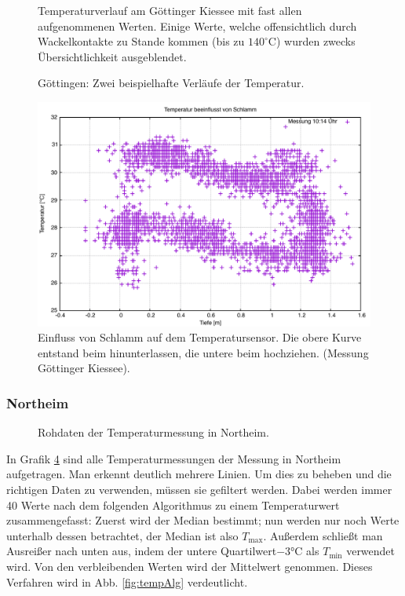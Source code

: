 \documentclass[12pt,a4paper,titlepage,headinclude,bibtotoc]{scrartcl}
\numberwithin{equation}{subsection}
\begin{document}
\begin{figure}[h]
\centering

\caption{Temperaturverlauf am Göttinger Kiessee mit fast allen aufgenommenen Werten. Einige Werte, welche offensichtlich durch Wackelkontakte zu Stande kommen (bis zu $140^\circ$C) wurden zwecks Übersichtlichkeit ausgeblendet.}
\label{fig:temp_goe}
\end{figure}

\begin{figure}[!h]
	\centering
   \hfill
	\caption{Göttingen: Zwei beispielhafte Verläufe der Temperatur.}
	\label{fig:tempGoeBsp}
\end{figure}

\begin{figure}[h]
	\centering
	\includegraphics[width=0.8\linewidth]{TempSchlamm}
	\caption{Einfluss von Schlamm auf dem Temperatursensor. Die obere Kurve entstand beim hinunterlassen, die untere beim hochziehen. (Messung Göttinger Kiessee).}
	\label{fig:tempSchlamm}
\end{figure}


\subsubsection{Northeim}
\label{sec:austempnortheim}
\begin{figure}[!htb]
	\centering
	
	\caption{Rohdaten der Temperaturmessung in Northeim.}
	\label{fig:temp_nor_Roh}
\end{figure}

In Grafik \ref{fig:temp_nor_Roh} sind alle Temperaturmessungen der Messung in Northeim aufgetragen.
Man erkennt deutlich mehrere Linien.
Um dies zu beheben und die richtigen Daten zu verwenden, müssen sie gefiltert werden.
Dabei werden immer 40 Werte nach dem folgenden Algorithmus zu einem Temperaturwert zusammengefasst: 
Zuerst wird der Median bestimmt; nun werden nur noch Werte unterhalb dessen betrachtet, der Median ist also $T_\text{max}$. 
Außerdem schließt man Ausreißer nach unten aus, indem der untere Quartilwert$-3\si{\celsius}$ als $T_\text{min}$ verwendet wird.
Von den verbleibenden Werten wird der Mittelwert genommen.
Dieses Verfahren wird in Abb. \ref{fig:tempAlg} verdeutlicht.
\end{document}
